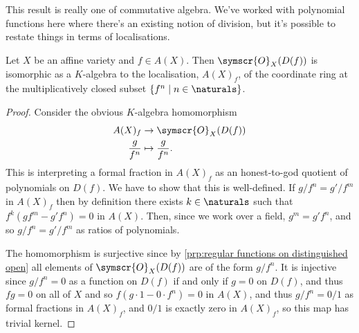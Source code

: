 \documentclass[fleqn]{NotesClass}
\newcommand{\sheaf}[1]{\symscr{#1}}
\begin{document}
    This result is really one of commutative algebra.
    We've worked with polynomial functions here where there's an existing notion of division, but it's possible to restate things in terms of localisations.
    
    \begin{crl}{}{}
        Let \(X\) be an affine variety and \(f \in A(X)\).
        Then \(\sheaf{O}_X(D(f))\) is isomorphic as a \(K\)-algebra to the localisation, \(A(X)_f\), of the coordinate ring at the multiplicatively closed subset \(\{f^n \mid n \in \naturals\}\).
        \begin{proof}
            Consider the obvious \(K\)-algebra homomorphism
            \begin{align}
                A(X)_f &\to \sheaf{O}_X(D(f))\\
                \frac{g}{f^n} &\mapsto \frac{g}{f^n}.
            \end{align}
            This is interpreting a formal fraction in \(A(X)_f\) as an honest-to-god quotient of polynomials on \(D(f)\).
            We have to show that this is well-defined.
            If \(g/f^n = g'/f^m\) in \(A(X)_f\) then by definition there exists \(k \in \naturals\) such that \(f^k(gf^m - g'f^n) = 0\) in \(A(X)\).
            Then, since we work over a field, \(g^m = g'f^n\), and so \(g/f^n = g'/f^m\) as ratios of polynomials.
            
            The homomorphism is surjective since by \cref{prp:regular functions on distinguished open} all elements of \(\sheaf{O}_X(D(f))\) are of the form \(g/f^n\).
            It is injective since \(g/f^n = 0\) as a function on \(D(f)\) if and only if \(g = 0\) on \(D(f)\), and thus \(fg = 0\) on all of \(X\) and so \(f(g \cdot 1 - 0 \cdot f^n) = 0\) in \(A(X)\), and thus \(g/f^n = 0/1\) as formal fractions in \(A(X)_f\), and \(0/1\) is exactly zero in \(A(X)_f\), so this map has trivial kernel.
        \end{proof}
    \end{crl}
    
\end{document}
